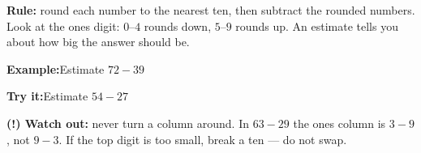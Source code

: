 \documentclass[12pt]{article}
\begin{document}

\begin{formulabox}
\textbf{Rule:} round each number to the nearest ten, then subtract the rounded numbers.
Look at the ones digit: $0$--$4$ rounds down, $5$--$9$ rounds up.
An estimate tells you about how big the answer should be.
\end{formulabox}

\begin{examplebox}
\textbf{Example:}\quad Estimate $72 - 39$
\end{examplebox}

\begin{tryitbox}
\textbf{Try it:}\quad Estimate $54 - 27$\\[2pt]
\end{tryitbox}

\begin{watchoutbox}
\textbf{(!) Watch out:} never turn a column around. In $63 - 29$ the ones column is
$3 - 9$, not $9 - 3$. If the top digit is too small, break a ten --- do not swap.
\end{watchoutbox}
\end{document}
